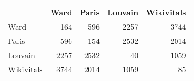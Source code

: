 \begin{tabular}{lrrrr}
\toprule
{} &  Ward &  Paris &  Louvain &  Wikivitals \\
\midrule
Ward       &   164 &    596 &     2257 &        3744 \\
Paris      &   596 &    154 &     2532 &        2014 \\
Louvain    &  2257 &   2532 &       40 &        1059 \\
Wikivitals &  3744 &   2014 &     1059 &          85 \\
\bottomrule
\end{tabular}
